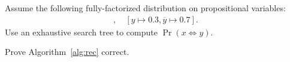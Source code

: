 \documentclass{tufte-handout}
\begin{document}

\begin{exercise}[$\star$]
    Assume the following fully-factorized distribution on propositional variables:
    \begin{align*}
        [x \mapsto 0.1, \overline{x} \mapsto 0.9],\quad [y \mapsto 0.3, \overline{y} \mapsto 0.7].
    \end{align*}
    Use an exhaustive search tree to compute $\Pr(x \Leftrightarrow y)$.
\end{exercise}
\begin{exercise}[$\star\star$]
    Prove Algorithm~\ref{alg:rec} correct.
\end{exercise}




\end{document}
